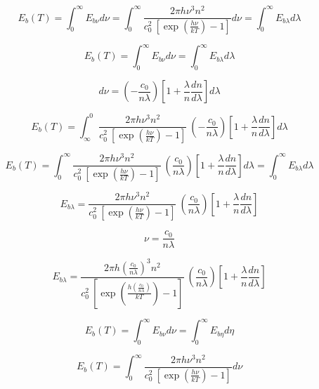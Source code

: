 \documentclass[12pt]{article}
\renewcommand{\_}{\kern-1.5pt\textunderscore\kern-1.5pt}
\begin{document}
\begin{itemize}
 \[ E_{b} \left( T \right) = \int _{0}^{\infty}E_{b \nu } d \nu =  \int _{0}^{\infty}\frac{2 \pi h \nu ^{3}n^{2}}{c_{0}^{2}~ \left[ \exp  \left( \frac{h \nu }{kT} \right) -1 \right] } d \nu = \int _{0}^{\infty}E_{b \lambda }d \lambda  \] \par

 \[ E_{b} \left( T \right) = \int _{0}^{\infty}E_{b \nu } d \nu =  \int _{0}^{\infty}E_{b \lambda }d \lambda  \] \par

 \[ d \nu = \left( -\frac{c_{0}}{n \lambda } \right)  \left[ 1+\frac{ \lambda }{n}\frac{dn}{d \lambda } \right] d \lambda  \] \par

 \[ E_{b} \left( T \right) =  \int _{\infty}^{0}\frac{2 \pi h \nu ^{3}n^{2}}{c_{0}^{2}~ \left[ \exp  \left( \frac{h \nu }{kT} \right) -1 \right] }~ \left( -\frac{c_{0}}{n \lambda } \right)  \left[ 1+\frac{ \lambda }{n}\frac{dn}{d \lambda } \right] d \lambda  \] \par

 \[ E_{b} \left( T \right) =  \int _{0}^{\infty}\frac{2 \pi h \nu ^{3}n^{2}}{c_{0}^{2}~ \left[ \exp  \left( \frac{h \nu }{kT} \right) -1 \right] }~ \left( \frac{c_{0}}{n \lambda } \right)  \left[ 1+\frac{ \lambda }{n}\frac{dn}{d \lambda } \right] d \lambda =  \int _{0}^{\infty}E_{b \lambda }d \lambda  \] \par


\vspace{\baselineskip}
 \[ E_{b \lambda }=\frac{2 \pi h \nu ^{3}n^{2}}{c_{0}^{2}~ \left[ \exp  \left( \frac{h \nu }{kT} \right) -1 \right] }~ \left( \frac{c_{0}}{n \lambda } \right)  \left[ 1+\frac{ \lambda }{n}\frac{dn}{d \lambda } \right]  \] \par

 \[  \nu =\frac{c_{0}}{n \lambda } \] \par

 \[ E_{b \lambda }=\frac{2 \pi h \left( \frac{c_{0}}{n \lambda } \right) ^{3}n^{2}}{c_{0}^{2}~ \left[ \exp  \left( \frac{h \left( \frac{c_{0}}{n \lambda } \right) }{kT} \right) -1 \right] }~ \left( \frac{c_{0}}{n \lambda } \right)  \left[ 1+\frac{ \lambda }{n}\frac{dn}{d \lambda } \right]  \] \par

 \[ E_{b} \left( T \right) = \int _{0}^{\infty}E_{b \nu } d \nu =  \int _{0}^{\infty}E_{b \eta }d \eta  \] \par

 \[ E_{b} \left( T \right) = \int _{0}^{\infty}\frac{2 \pi h \nu ^{3}n^{2}}{c_{0}^{2}~ \left[ \exp  \left( \frac{h \nu }{kT} \right) -1 \right] } d \nu  \] \par


\end{itemize}
\end{document}
